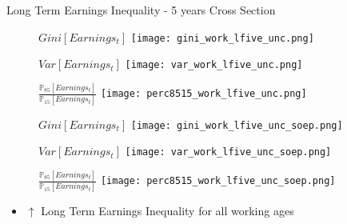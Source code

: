 \documentclass{beamer}
\begin{document}
\begin{frame}{Long Term Earnings Inequality - 5 years Cross Section }
\begin{figure}[!t]
\centering
\begin{minipage}[b]{0.32\textwidth}{$Gini[Earnings_t]$}
\centering
\texttt{[image: gini\_work\_lfive\_unc.png]}
\end{minipage}
\begin{minipage}[b]{0.32\textwidth}{$Var[Earnings_t]$}
\centering
\texttt{[image: var\_work\_lfive\_unc.png]}
\end{minipage}
\begin{minipage}[b]{0.32\textwidth}{$\frac{\mathbb{P}_{85}[Earnings_t]}{\mathbb{P}_{15}[Earnings_t]}$}
\centering
\texttt{[image: perc8515\_work\_lfive\_unc.png]}
\end{minipage}
\begin{minipage}[b]{0.32\textwidth}{$Gini[Earnings_t]$}
\centering
\texttt{[image: gini\_work\_lfive\_unc\_soep.png]}
\end{minipage}
\begin{minipage}[b]{0.32\textwidth}{$Var[Earnings_t]$}
\centering
\texttt{[image: var\_work\_lfive\_unc\_soep.png]}
\end{minipage}
\begin{minipage}[b]{0.32\textwidth}{$\frac{\mathbb{P}_{85}[Earnings_t]}{\mathbb{P}_{15}[Earnings_t]}$}
\centering
\texttt{[image: perc8515\_work\_lfive\_unc\_soep.png]}
\end{minipage}
\end{figure}
\begin{itemize}
\setlength{\itemsep}{0.7 cm}
\item $\uparrow$ Long Term Earnings Inequality for all working ages
\end{itemize}
\end{frame}
\end{document}
